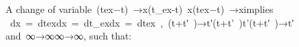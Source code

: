 A change of variable (tex−t) →x\left(t_{ex}-t\right)\ \to x(tex​−t) →x​ implies   dx = dtexdx\ =\ dt_{ex}dx = dtex​​ , (t+t′ )→t′\left(t+t'\ \right)\to t'(t+t′ )→t′​ and ∞→∞\infty\to\infty∞→∞​, such that:
